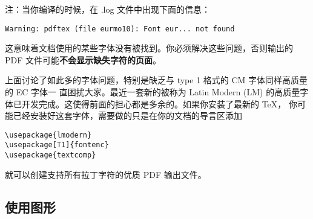 注：当你编译的时候，在 .log 文件中出现下面的信息：
\begin{verbatim}
Warning: pdftex (file eurmo10): Font eur... not found
\end{verbatim}
这意味着文档使用的某些字体没有被找到。你必须解决这些问题，否则输出的 PDF 
文件可能\textbf{不会显示缺失字符的页面}。


上面讨论了如此多的字体问题，特别是缺乏与 type 1 格式的 CM 字体同样高质量的 EC 字体一
直困扰大家。最近一套新的被称为  Latin Modern
(LM) 的高质量字体已开发完成。这使得前面的担心都是多余的。如果你安装了最新的 \TeX{}，
你可能已经安装好这套字体，需要做的只是在你的文档的导言区添加
\begin{code}
\begin{verbatim}
\usepackage{lmodern}
\usepackage[T1]{fontenc}
\usepackage{textcomp}
\end{verbatim}
\end{code}
就可以创建支持所有拉丁字符的优质 PDF 输出文件。


\subsection{使用图形}
\label{ssec:pdfgraph}


